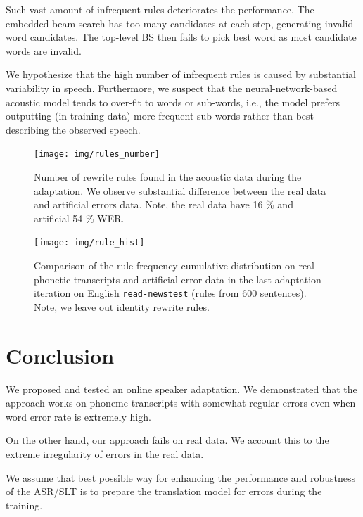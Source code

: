 Such vast amount of infrequent rules deteriorates the performance. The embedded beam search has too many candidates at each step, generating invalid word candidates. The top-level BS then fails to pick best word as most candidate words are invalid.

We hypothesize that the high number of infrequent rules is caused by substantial variability in speech. Furthermore, we suspect that the neural-network-based acoustic model tends to over-fit to words or sub-words, i.e., the model prefers outputting (in training data) more frequent sub-words rather than best describing the observed speech. 

\begin{figure}[h]
	\texttt{[image: img/rules\_number]}
	\caption{Number of rewrite rules found in the acoustic data during the adaptation. We observe substantial difference between the real data and artificial errors data. Note, the real data have 16 \% and artificial 54 \% WER.}
	\label{fig:rule_number} 
\end{figure}

\begin{figure}[h]
	\texttt{[image: img/rule\_hist]}
	\caption{Comparison of the rule frequency cumulative distribution on real phonetic transcripts and artificial error data in the last adaptation iteration on English \texttt{read-newstest} (rules from 600 sentences). Note, we leave out identity rewrite rules.}
	\label{fig:rule_hist} 
\end{figure}

\section{Conclusion}
\label{oeasr:conclusion}
We proposed and tested an online speaker adaptation. We demonstrated that the approach works on phoneme transcripts with somewhat regular errors even when word error rate is extremely high. 

On the other hand, our approach fails on real data. We account this to the extreme irregularity of errors in the real data. 

We assume that best possible way for enhancing the performance and robustness of the ASR/SLT is to prepare the translation model for errors during the training. 


